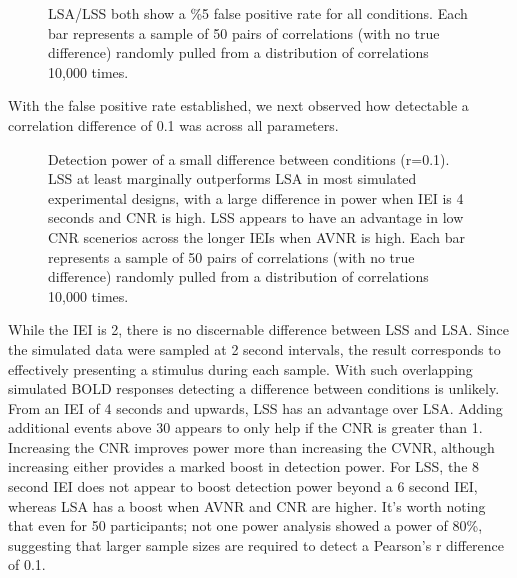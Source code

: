 \documentclass[10pt,letterpaper]{article}
\begin{document}
\begin{figure}[H]
  \centering


  \caption{
    LSA/LSS both show a \%5 false positive rate for all conditions.
    Each bar represents a sample of 50 pairs of correlations (with no true difference)
    randomly pulled from a distribution of correlations 10,000 times.
  }
  \label{fig:res_sim_fpr}
\end{figure}

With the false positive rate established, we next observed how detectable a
correlation difference of 0.1 was across all parameters.

\begin{figure}[H]
  \centering


  \caption{
    Detection power of a small difference between conditions (r=0.1).
    LSS at least marginally outperforms LSA in most simulated experimental
    designs, with a large difference in power when IEI is 4 seconds and
    CNR is high.
    LSS appears to have an advantage in low CNR scenerios across the longer IEIs
    when AVNR is high.
    Each bar represents a sample of 50 pairs of correlations (with no true difference)
    randomly pulled from a distribution of correlations 10,000 times.
  }
  \label{fig:res_sim_smalldiff}
\end{figure}

While the IEI is 2, there is no discernable difference between LSS and LSA.
Since the simulated data were sampled at 2 second intervals, the result
corresponds to effectively presenting a stimulus during each sample.
With such overlapping simulated BOLD responses detecting a difference between conditions
is unlikely.
From an IEI of 4 seconds and upwards, LSS has an advantage over LSA.
Adding additional events above 30 appears to only help if the CNR is greater than 1.
Increasing the CNR improves power more than increasing the CVNR, although increasing either
provides a marked boost in detection power.
For LSS, the 8 second IEI does not appear to boost detection power beyond a 6 second IEI,
whereas LSA has a boost when AVNR and CNR are higher.
It's worth noting that even for 50 participants; not one power analysis showed
a power of 80\%, suggesting that larger sample sizes are required to detect a Pearson's r
difference of 0.1.
\end{document}
